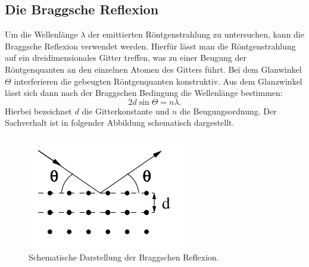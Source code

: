 \subsection{Die Braggsche Reflexion}
Um die Wellenlänge $\lambda$ der emittierten Röntgenstrahlung zu untersuchen,
kann die Braggsche Reflexion verwendet werden. Hierfür lässt man die Röntgenstrahlung
auf ein dreidimensionales Gitter treffen, was zu einer Beugung der Röntgenquanten
an den einzelnen Atomen des Gitters führt.  Bei dem Glanwinkel $\Theta$ interferieren
die gebeugten Röntgenquanten konstruktiv. Aus dem Glanzwinkel lässt sich dann
nach der Braggschen Bedingung die Wellenlänge bestimmen:
\begin{equation}
  2 d \sin \Theta = n \lambda.
  \label{eqn:braggtheorie}
\end{equation}
Hierbei bezeichnet $d$ die Gitterkonstante und $n$ die Beugungsordnung. Der
Sachverhalt ist in folgender Abbildung schematisch dargestellt.
\begin{figure}[H]
  \centering
  \includegraphics[scale=0.5]{"content/bragg.png"}
  \caption{Schematische Darstellung der Braggschen Reflexion.}
  \label{fig:braggtheorie}
\end{figure}
